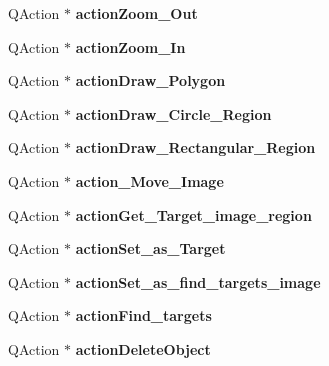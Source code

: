 \begin{DoxyCompactItemize}
Q\+Action $\ast$ {\bfseries action\+Zoom\+\_\+\+Out}
\item 
\mbox{\label{class_ui___main_window_ab434596b50558d4af1aafe9f12e2506d}} 
Q\+Action $\ast$ {\bfseries action\+Zoom\+\_\+\+In}
\item 
\mbox{\label{class_ui___main_window_aa78e3b62dac716cb847f0a596ca306b3}} 
Q\+Action $\ast$ {\bfseries action\+Draw\+\_\+\+Polygon}
\item 
\mbox{\label{class_ui___main_window_a119c0efbb5d7be171f4d185fb870d84c}} 
Q\+Action $\ast$ {\bfseries action\+Draw\+\_\+\+Circle\+\_\+\+Region}
\item 
\mbox{\label{class_ui___main_window_aa519676ff6f538fdc82d166c8a5ba3c1}} 
Q\+Action $\ast$ {\bfseries action\+Draw\+\_\+\+Rectangular\+\_\+\+Region}
\item 
\mbox{\label{class_ui___main_window_a0caf67c24cebb02f79d540ac2724b552}} 
Q\+Action $\ast$ {\bfseries action\+\_\+\+Move\+\_\+\+Image}
\item 
\mbox{\label{class_ui___main_window_a93eb409b55181ad3172ecb3cf4526b6a}} 
Q\+Action $\ast$ {\bfseries action\+Get\+\_\+\+Target\+\_\+image\+\_\+region}
\item 
\mbox{\label{class_ui___main_window_a4afb2fff67e388342106ba951cd83874}} 
Q\+Action $\ast$ {\bfseries action\+Set\+\_\+as\+\_\+\+Target}
\item 
\mbox{\label{class_ui___main_window_a4ee2dd67387e3d42136a5a5a3aa38afc}} 
Q\+Action $\ast$ {\bfseries action\+Set\+\_\+as\+\_\+find\+\_\+targets\+\_\+image}
\item 
\mbox{\label{class_ui___main_window_a2d22f2f4ee336b2c154eacd14fe822c0}} 
Q\+Action $\ast$ {\bfseries action\+Find\+\_\+targets}
\item 
\mbox{\label{class_ui___main_window_a4a89ffd0ae47941091c89658e2fca0ab}} 
Q\+Action $\ast$ {\bfseries action\+Delete\+Object}
\item 

\end{DoxyCompactItemize}
